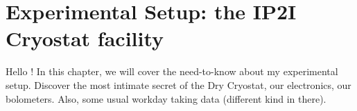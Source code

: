 
\chapter{Experimental Setup: the IP2I Cryostat facility} %

\label{ChapterExperiment} %


Hello !
In this chapter, we will cover the need-to-know about my experimental setup.
Discover the most intimate secret of the Dry Cryostat, our electronics, our bolometers.
Also, some usual workday taking data (different kind in there).